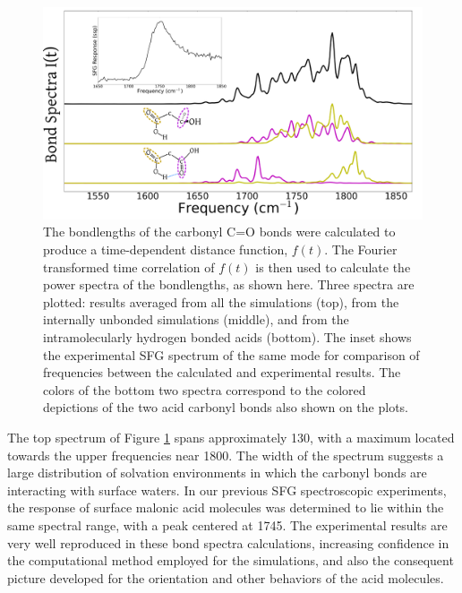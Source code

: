 \begin{figure}[h!]
	\begin{center}
		\includegraphics[scale=1.0]{images/bond-spectra/BondSpectra.png}
		\caption{The bondlengths of the carbonyl C=O bonds were calculated to produce a time-dependent distance function, $f(t)$. The Fourier transformed time correlation of $f(t)$ is then used to calculate the power spectra of the bondlengths, as shown here. Three spectra are plotted: results averaged from all the simulations (top), from the internally unbonded simulations (middle), and from the intramolecularly hydrogen bonded acids (bottom). The inset shows the experimental SFG spectrum of the same mode for comparison of frequencies between the calculated and experimental results. The colors of the bottom two spectra correspond to the colored depictions of the two acid carbonyl bonds also shown on the plots.}
		\label{fig:bond-spectra}
	\end{center}
\end{figure}

The top spectrum of Figure \ref{fig:bond-spectra} spans approximately 130\cm, with a maximum located towards the upper frequencies near 1800\cm. The width of the spectrum suggests a large distribution of solvation environments in which the carbonyl bonds are interacting with surface waters. In our previous SFG spectroscopic experiments, the response of surface malonic acid molecules was determined to lie within the same spectral range, with a peak centered at 1745\cm. The experimental results are very well reproduced in these bond spectra calculations, increasing confidence in the computational method employed for the simulations, and also the consequent picture developed for the orientation and other behaviors of the acid molecules.

